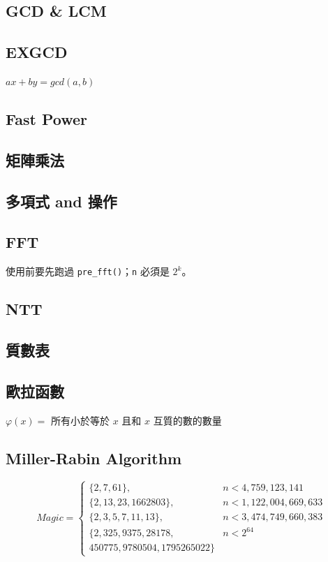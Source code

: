 \documentclass[a4paper,10pt,twocolumn,oneside]{article}
\newcommand{\inputcpp}[1]{}  %
\begin{document}
\subsection{GCD \& LCM}
\inputcpp{math/gcd_lcm.cpp}

\subsection{EXGCD}
$ax + by = gcd(a, b)$
\inputcpp{math/exgcd.cpp}

\subsection{Fast Power}
\inputcpp{math/fast_pow.cpp}

\subsection{矩陣乘法}
\inputcpp{math/mat_mul.cpp}

\subsection{多項式 and 操作}
\inputcpp{math/poly_basic.cpp}

\subsection{FFT}
使用前要先跑過 \texttt{pre\_fft()}；\texttt{n} 必須是 $2^k$。
\inputcpp{math/fast_fourier_transform.cpp}

\subsection{NTT}
\inputcpp{math/number_theoretic_transform.cpp}

\subsection{質數表}
\inputcpp{math/primes_table.cpp}

\subsection{歐拉函數}
$\varphi(x) = $ 所有小於等於 $x$ 且和 $x$ 互質的數的數量
\inputcpp{math/phi.cpp}

\subsection{Miller-Rabin Algorithm}
\begin{equation*}
  Magic = \begin{cases}
    \{2, 7, 61\},           & n < 4,759,123,141     \\
    \{2, 13, 23, 1662803\}, & n < 1,122,004,669,633 \\
    \{2, 3, 5, 7, 11, 13\}, & n < 3,474,749,660,383 \\
    \{2, 325, 9375, 28178,  & n < 2^{64}            \\
    450775, 9780504, 1795265022\}
  \end{cases}
\end{equation*}
\inputcpp{math/miller_rabin.cpp}
\end{document}
